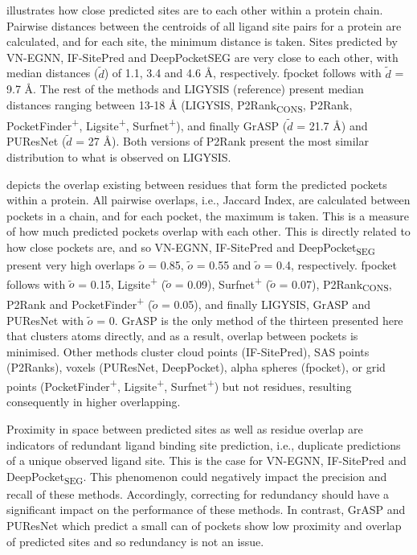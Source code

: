 illustrates how close predicted sites are to each other within a protein chain. Pairwise distances between the centroids of all ligand site pairs for a protein are calculated, and for each site, the minimum distance is taken. Sites predicted by VN-EGNN, IF-SitePred and DeepPocketSEG are very close to each other, with median distances ($\tilde{d}$) of 1.1, 3.4 and 4.6 \AA{}, respectively. fpocket follows with $\tilde{d}$ = 9.7 \AA{}. The rest of the methods and LIGYSIS (reference) present median distances ranging between 13-18 \AA{} (LIGYSIS, P2Rank\textsubscript{CONS}, P2Rank, PocketFinder\textsuperscript{+}, Ligsite\textsuperscript{+}, Surfnet\textsuperscript{+}), and finally GrASP ($\tilde{d}$ = 21.7 \AA{}) and PUResNet ($\tilde{d}$ = 27 \AA{}). Both versions of P2Rank present the most similar distribution to what is observed on LIGYSIS.

 depicts the overlap existing between residues that form the predicted pockets within a protein. All pairwise overlaps, i.e., Jaccard Index, are calculated between pockets in a chain, and for each pocket, the maximum is taken. This is a measure of how much predicted pockets overlap with each other. This is directly related to how close pockets are, and so VN-EGNN, IF-SitePred and DeepPocket\textsubscript{SEG} present very high overlaps $\tilde{o}$ = 0.85, $\tilde{o}$ = 0.55 and $\tilde{o}$ = 0.4, respectively. fpocket follows with $\tilde{o}$ = 0.15, Ligsite\textsuperscript{+} ($\tilde{o}$ = 0.09), Surfnet\textsuperscript{+} ($\tilde{o}$ = 0.07), P2Rank\textsubscript{CONS}, P2Rank and PocketFinder\textsuperscript{+} ($\tilde{o}$ = 0.05), and finally LIGYSIS, GrASP and PUResNet with $\tilde{o}$ = 0. GrASP is the only method of the thirteen presented here that clusters atoms directly, and as a result, overlap between pockets is minimised. Other methods cluster cloud points (IF-SitePred), SAS points (P2Ranks), voxels (PUResNet, DeepPocket), alpha spheres (fpocket), or grid points (PocketFinder\textsuperscript{+}, Ligsite\textsuperscript{+}, Surfnet\textsuperscript{+}) but not residues, resulting consequently in higher overlapping.

Proximity in space between predicted sites as well as residue overlap are indicators of redundant ligand binding site prediction, i.e., duplicate predictions of a unique observed ligand site. This is the case for VN-EGNN, IF-SitePred and DeepPocket\textsubscript{SEG}. This phenomenon could negatively impact the precision and recall of these methods. Accordingly, correcting for redundancy should have a significant impact on the performance of these methods. In contrast, GrASP and PUResNet which predict a small can of pockets show low proximity and overlap of predicted sites and so redundancy is not an issue.


